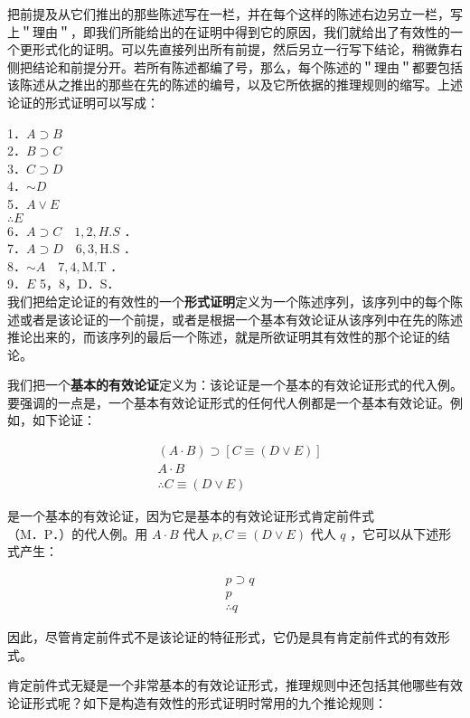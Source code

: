 把前提及从它们推出的那些陈述写在一栏，并在每个这样的陈述右边另立一栏，写上＂理由＂，即我们所能给出的在证明中得到它的原因，我们就给出了有效性的一个更形式化的证明。可以先直接列出所有前提，然后另立一行写下结论，稍微靠右侧把结论和前提分开。若所有陈述都编了号，那么，每个陈述的＂理由＂都要包括该陈述从之推出的那些在先的陈述的编号，以及它所依据的推理规则的缩写。上述论证的形式证明可以写成：

1．$A \supset B$\\
2．$B \supset C$\\
3．$C \supset D$\\
4．$\sim D$\\
5．$A \vee E$\\
$\therefore E$\\
6．$A \supset C \quad 1,2, H . S$ ．\\
7．$A \supset D \quad 6,3, \mathrm{H} . \mathrm{S}$ ．\\
8．$\sim A \quad 7,4, \mathrm{M} . \mathrm{T}$ ．\\
9．$E$ 5，8，D．S．\\
我们把给定论证的有效性的一个\textbf{形式证明}定义为一个陈述序列，该序列中的每个陈述或者是该论证的一个前提，或者是根据一个基本有效论证从该序列中在先的陈述推论出来的，而该序列的最后一个陈述，就是所欲证明其有效性的那个论证的结论。

我们把一个\textbf{基本的有效论证}定义为：该论证是一个基本的有效论证形式的代入例。要强调的一点是，一个基本有效论证形式的任何代人例都是一个基本有效论证。例如，如下论证：

$$
\begin{aligned}
& (A \cdot B) \supset[C \equiv(D \vee E)] \\
& A \cdot B \\
& \therefore C \equiv(D \vee E)
\end{aligned}
$$

是一个基本的有效论证，因为它是基本的有效论证形式肯定前件式\\
（M．P．）的代人例。用 $A \cdot B$ 代人 $p, C \equiv(D \vee E)$ 代人 $q$ ，它可以从下述形式产生：

$$
\begin{aligned}
& p \supset q \\
& p \\
& \therefore q
\end{aligned}
$$

因此，尽管肯定前件式不是该论证的特征形式，它仍是具有肯定前件式的有效形式。

肯定前件式无疑是一个非常基本的有效论证形式，推理规则中还包括其他哪些有效论证形式呢？如下是构造有效性的形式证明时常用的九个推论规则：

